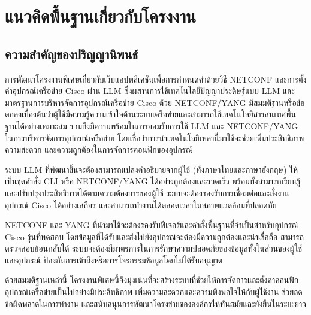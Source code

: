 
\section{แนวคิดพื้นฐานเกี่ยวกับโครงงาน}

\subsection{ความสำคัญของปริญญานิพนธ์}

\hspace*{1.3em} %
การพัฒนาโครงงานพิเศษเกี่ยวกับเว็บแอปพลิเคชันเพื่อการกำหนดค่าด้วยวิธี NETCONF และการตั้งค่าอุปกรณ์เครือข่าย Cisco ผ่าน LLM ซึ่งผสานการใช้เทคโนโลยีปัญญาประดิษฐ์แบบ LLM และมาตรฐานการบริหารจัดการอุปกรณ์เครือข่าย Cisco ด้วย NETCONF/YANG มีสมมติฐานหรือข้อตกลงเบื้องต้นว่าผู้ใช้มีความรู้ความเข้าใจด้านระบบเครือข่ายและสามารถใช้เทคโนโลยีสารสนเทศพื้นฐานได้อย่างเหมาะสม รวมถึงมีความพร้อมในการยอมรับการใช้ LLM และ NETCONF/YANG ในการบริหารจัดการอุปกรณ์เครือข่าย โดยเชื่อว่าการนำเทคโนโลยีเหล่านี้มาใช้จะช่วยเพิ่มประสิทธิภาพ ความสะดวก และความถูกต้องในการจัดการคอนฟิกของอุปกรณ์

\hspace*{1.3em} %
ระบบ LLM ที่พัฒนาขึ้นจะต้องสามารถแปลงคำอธิบายจากผู้ใช้ (ทั้งภาษาไทยและภาษาอังกฤษ) ให้เป็นชุดคำสั่ง CLI หรือ NETCONF/YANG ได้อย่างถูกต้องและรวดเร็ว พร้อมทั้งสามารถเรียนรู้และปรับปรุงประสิทธิภาพได้ตามความต้องการของผู้ใช้ ระบบจะต้องรองรับการเชื่อมต่อและสั่งงานอุปกรณ์ Cisco ได้อย่างเสถียร และสามารถทำงานได้ตลอดเวลาในสภาพแวดล้อมที่ปลอดภัย

\hspace*{1.3em} %
NETCONF และ YANG ที่นำมาใช้จะต้องรองรับฟีเจอร์และคำสั่งพื้นฐานที่จำเป็นสำหรับอุปกรณ์ Cisco รุ่นที่ทดสอบ โดยข้อมูลที่ได้รับและส่งไปยังอุปกรณ์จะต้องมีความถูกต้องและน่าเชื่อถือ สามารถตรวจสอบย้อนกลับได้ ระบบจะต้องมีมาตรการในการรักษาความปลอดภัยของข้อมูลทั้งในส่วนของผู้ใช้และอุปกรณ์ ป้องกันการเข้าถึงหรือการโจรกรรมข้อมูลโดยไม่ได้รับอนุญาต

\hspace*{1.3em} %
ด้วยสมมติฐานเหล่านี้ โครงงานพิเศษนี้จึงมุ่งเน้นที่จะสร้างระบบที่ช่วยให้การจัดการและตั้งค่าคอนฟิกอุปกรณ์เครือข่ายเป็นไปอย่างมีประสิทธิภาพ เพิ่มความสะดวกและความพึงพอใจให้กับผู้ใช้งาน ช่วยลดข้อผิดพลาดในการทำงาน และสนับสนุนการพัฒนาโครงข่ายขององค์กรให้ทันสมัยและยั่งยืนในระยะยาว

